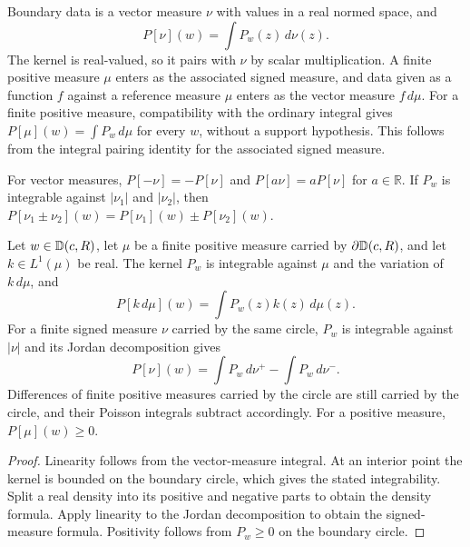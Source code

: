 \begin{definition}
  \label{def:poisson_integral}
  \leanok
  Boundary data is a vector measure $\nu$ with values in a real normed space,
  and
  \[
    P[\nu](w)=\int P_w(z)\,d\nu(z).
  \]
  The kernel is real-valued, so it pairs with $\nu$ by scalar multiplication.
  A finite positive measure $\mu$ enters as the associated signed measure, and
  data given as a function $f$ against a reference measure $\mu$ enters as the
  vector measure $f\,d\mu$. For a finite positive measure, compatibility with
  the ordinary integral gives $P[\mu](w)=\int P_w\,d\mu$ for every $w$, without
  a support hypothesis. This follows from the integral pairing identity for
  the associated signed measure.
\end{definition}

\begin{lemma}
  \label{lem:poisson_integral_linear}
  \leanok
  For vector measures, $P[-\nu]=-P[\nu]$ and $P[a\nu]=aP[\nu]$ for
  $a\in\mathbb R$. If $P_w$ is integrable against $|\nu_1|$ and $|\nu_2|$, then
  $P[\nu_1\pm\nu_2](w)=P[\nu_1](w)\pm P[\nu_2](w)$.

  Let $w\in\mathbb{D}(c,R)$, let $\mu$ be a finite positive measure carried by
  $\partial\mathbb{D}(c,R)$, and let $k\in L^1(\mu)$ be real. The kernel $P_w$ is
  integrable against $\mu$ and the variation of $k\,d\mu$, and
  \[
    P[k\,d\mu](w)=\int P_w(z)k(z)\,d\mu(z).
  \]
  For a finite signed measure $\nu$ carried by the same circle, $P_w$ is
  integrable against $|\nu|$ and its Jordan decomposition gives
  \[
    P[\nu](w)=\int P_w\,d\nu^+-\int P_w\,d\nu^-.
  \]
  Differences of finite positive measures carried by the circle are still
  carried by the circle, and their Poisson integrals subtract accordingly.
  For a positive measure, $P[\mu](w)\ge0$.
  \begin{proof}
    \leanok
    Linearity follows from the vector-measure integral. At an interior point
    the kernel is bounded on the boundary circle, which gives the stated
    integrability. Split a real density into its positive and negative parts
    to obtain the density formula. Apply linearity to the Jordan decomposition
    to obtain the signed-measure formula. Positivity follows from $P_w\ge0$
    on the boundary circle.
  \end{proof}
\end{lemma}

